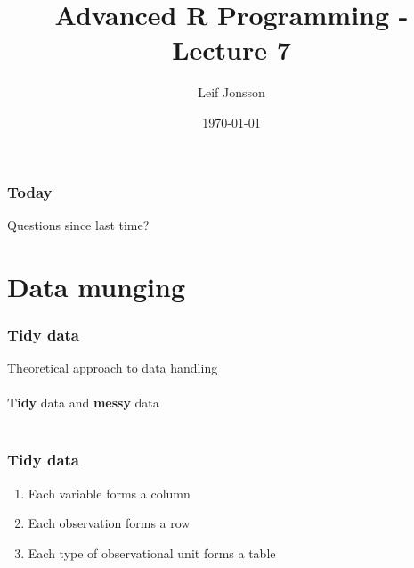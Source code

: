 \documentclass{beamer}
\title[Lecture 7]{Advanced R Programming - Lecture 7} %
\author{Leif Jonsson} %
\institute[STIMA LiU] %
{
Link\"{o}ping University \\ %
\medskip
\textit{leif.jonsson@ericsson.com\\leif.r.jonsson@liu.se} %
}
\date{\today} %
\begin{document}
\begin{frame}
\titlepage %
\end{frame}

\begin{frame}
\frametitle{Today} %
\tableofcontents %
\end{frame}


\begin{frame}
	\Huge{\centerline{Questions since last time?}}
\end{frame}

\section{Data munging}

\begin{frame}
	\frametitle{Tidy data}
	\begin{center}
		Theoretical approach to data handling\\~\\
		\textbf{Tidy} data and \textbf{messy} data\\~\\
	\end{center}
\end{frame}

\begin{frame}
	\frametitle{Tidy data}
	\begin{center}
		\begin{enumerate}
			\item Each variable forms a column
			\item Each observation forms a row
			\item Each type of observational unit forms a table
		\end{enumerate}
	\end{center}
\end{frame}
\end{document}
